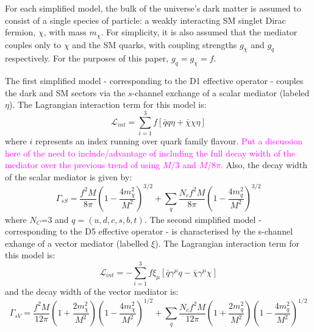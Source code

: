 \begin{flushleft}
For each simplified model, the bulk of the universe's dark matter is assumed to consist of a single species of particle: a weakly interacting SM singlet Dirac fermion, $\chi$, with mass $m_{\chi}$. For simplicity, it is also assumed that the mediator couples only to $\chi$ and the SM quarks, with coupling strengths $g_{\chi}$ and $g_q$ respectively. For the purposes of this paper, $g_q = g_{\chi}=f$.

\hspace{1cm} The first simplified model - corresponding to the D1 effective operator - couples the dark and SM sectors via the $s$-channel exchange of a scalar mediator (labeled $\eta$). The Lagrangian interaction term for this model is:
\begin{equation}
\label{L_int_sS}
\mathcal{L}_{int} = \sum\limits_{i=1}^{3} f \left[\bar{q}q\eta + \bar{\chi}\chi\eta\right]
\end{equation}
where $i$ represents an index running over quark family flavour. \textcolor{magenta}{Put a discussion here of the need to include/advantage of including the full decay width of the mediator over the previous trend of using $M/3$ and $M/8\pi$.} Also, the decay width of the scalar mediator is given by:
\begin{equation}
\label{gamma_sS}
\Gamma_{sS} = \frac{f^{2} M}{8\pi}\left(1 - \frac{4m_{\chi}^{2}}{M^{2}}\right)^{3/2} + \sum_{\substack{q}}\frac{N_{c}f^{2} M}{8\pi}\left(1 - \frac{4m_{q}^{2}}{M^{2}}\right)^{3/2}
\end{equation}
where $N_{C}$=3 and $q = (u, d, c, s, b, t)$.
The second simplified model - corresponding to the D5 effective operator - is characterised by the s-channel exhange of a vector mediator (labelled $\xi$). The Lagrangian interaction term for this model is:
\begin{equation}
\label{L_int_sV}
\mathcal{L}_{int} = -\sum\limits_{i=1}^{3} f\xi_{\mu} \left[\bar{q}\gamma^{\mu}q - \bar{\chi}\gamma^{\mu}\chi\right]
\end{equation}
and the decay width of the vector mediator is:
\begin{equation}
\label{gamma_sV}
\Gamma_{sV} = \frac{f^{2} M}{12\pi}\left(1 + \frac{2m_{\chi}^{2}}{M^{2}}\right)\left(1 - \frac{4m_{\chi}^{2}}{M^{2}}\right)^{1/2} + \sum_{\substack{q}}\frac{N_{c}f^{2}M}{12\pi}\left(1 + \frac{2m_{q}^{2}}{M^{2}}\right)\left(1 - \frac{4m_{q}^{2}}{M^{2}}\right)^{1/2}
\end{equation}


\end{flushleft}
